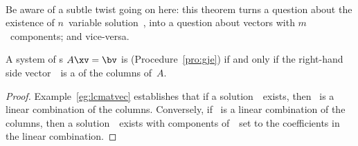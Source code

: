 \begin{theorem} \label{thm:conlincom} \ 
\begin{aside}
Be aware of a subtle twist going on here: this theorem turns a question about the existence of \(n\)~variable solution~\xv, into a question about vectors with \(m\)~components; and vice-versa.
\end{aside}
A system of s \(A\xv=\bv\) is  (Procedure~\ref{pro:gje}) if and only if the right-hand side vector~\bv\ is a  of the columns of~\(A\).
\end{theorem}

\begin{proof} 
Example~\ref{eg:lcmatvec} establishes that if a solution~\xv\ exists, then \bv~is a linear combination of the columns.
Conversely, if \bv~is a linear combination of the columns, then a solution~\xv\ exists with components of~\xv\ set to the coefficients in the linear combination.
\end{proof}



